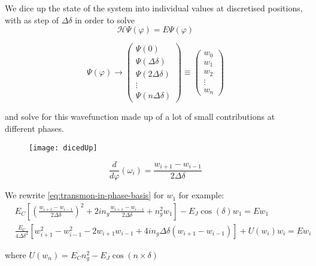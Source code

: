  \begin{framed}\noindent
   We dice up the state of the system into individual values at discretised positions, with as step of $ \Delta \delta $
   in order to solve
   \begin{equation}
     \mathcal{H}\Psi(\varphi) = E\Psi(\varphi)
   \end{equation}

\[
  \Psi(\varphi) \rightarrow \begin{pmatrix}
    \Psi(0)\\
    \Psi(\Delta \delta)\\
    \Psi(2\Delta \delta)\\\vdots
    \\
    \Psi(n\Delta \delta)
  \end{pmatrix}
  \equiv
  \begin{pmatrix}
    w_0\\
    w_1\\
    w_2\\
    \vdots\\
    w_{n}
  \end{pmatrix}
\]

\noindent and solve for this wavefunction made up of a lot of small contributions at different phases.
\end{framed}

\begin{figure}[h]
  \centering \texttt{[image: dicedUp]}
\end{figure}

\begin{equation}
  \frac{d}{d\varphi}\left(\omega_i\right) = \frac{w_{i+1} - w_{i-1}}{2\Delta\delta}
\end{equation}

\noindent We rewrite \autoref{eq:transmon-in-phase-basis} for $w_1$ for example:
\begin{equation}
  \begin{aligned}
    & E_C\left[\left(\frac{w_{i+1}-w_{i-1}}{2\Delta\delta} \right)^{2} + 2in_{g}\frac{w_{i+1}-w_{i-1}}{2\Delta\delta} + n_{g}^2w_1  \right] - E_J\cos(\delta)w_1 = Ew_1 \\
    &  \frac{E_C}{4\Delta\delta^{2}}\left[ w_{i+1}^2-w_{i-1}^2  - 2w_{i+1}w_{i-1}+  4in_{g}\Delta\delta(w_{i+1}-w_{i-1})
    \right] + U(w_{i})w_i = Ew_{i}
  \end{aligned}
\end{equation}

\noindent where $U(w_n) = E_Cn_{g}^2-E_J\cos(n\times\delta)$

